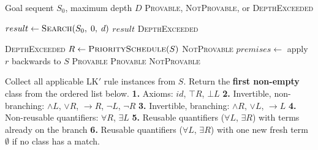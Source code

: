 
\begin{algorithm}
  \caption{Priority-ID backward proof search for LK$'$}\label{alg:priority-id}
  \begin{algorithmic}[1]
    \Require Goal sequent $S_0$, maximum depth $D$
    \Ensure \textsc{Provable}, \textsc{NotProvable}, or \textsc{DepthExceeded}

     
    \State $result \gets \Call{Search}{S_0,\; 0,\; d}$
    \State \Return $result$
    \EndIf
    \EndFor
    \State \Return \textsc{DepthExceeded}

    \State \Return \textsc{DepthExceeded}
    \EndIf
    \State $R \gets \Call{PrioritySchedule}{S}$
    \State \Return \textsc{NotProvable} 
    \EndIf
    \State $\mathit{premises} \gets$ apply $r$ backwards to $S$
     
    \State \Return \textsc{Provable}
    \EndIf
    \State \Return \textsc{Provable}
    \EndIf
    \EndFor
    \State \Return \textsc{NotProvable}
    \EndFunction

    \State Collect all applicable LK$'$ rule instances from $S$.
    \State Return the \textbf{first non-empty} class from the ordered
    list below.
    \Statex
    \Statex \textbf{1.} Axioms: $\mathit{id}$,\; $\top R$,\; $\bot L$
    \Statex \textbf{2.} Invertible, non-branching: $\wedge L$,\;
    $\vee R$,\; $\to R$,\; $\neg L$,\; $\neg R$
    \Statex \textbf{3.} Invertible, branching: $\wedge R$,\; $\vee L$,\; $\to L$
    \Statex \textbf{4.} Non-reusable quantifiers: $\forall R$,\; $\exists L$
    \Statex \textbf{5.} Reusable quantifiers ($\forall L$,\; $\exists
    R$) with terms already on the branch
    \Statex \textbf{6.} Reusable quantifiers ($\forall L$,\; $\exists
    R$) with one new fresh term
    \Statex
    \State \Return $\emptyset$ if no class has a match.
    \EndFunction

  \end{algorithmic}
\end{algorithm}
